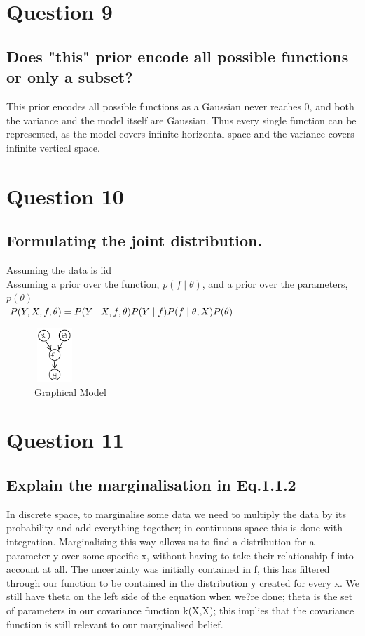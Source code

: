 \documentclass[a4paper, 9pt]{article}
\begin{document}
\section*{Question 9}
\subsection*{Does "this" prior encode all possible functions or only a subset?}
This prior encodes all possible functions as a Gaussian never reaches 0, and both the variance and the model itself are Gaussian. Thus every single function can be represented, as the model covers infinite horizontal space and the variance covers infinite vertical space.

\section*{Question 10}
\subsection*{Formulating the joint distribution.}
Assuming the data is iid \\
\newline
Assuming a prior over the function, \( p (f \mid \theta) \), and a prior over the parameters, \(p(\theta ) \) \\
\newline
\( P(Y, X, f, \theta) = P(Y \mid X, f, \theta) \\
\newline
P(Y \mid f)P(f \mid \theta, X)P( \theta) \)\\
\begin{figure}[h]
\begin{center}
\includegraphics[width=0.6in,height=0.8in]{path}
\end{center}
\caption{Graphical Model}
\end{figure}

\section*{Question 11}
\subsection*{Explain the marginalisation in Eq.1.1.2}
In discrete space, to marginalise some data we need to multiply the data by its probability and add everything together; in continuous space this is done with integration. Marginalising this way allows us to find a distribution for a parameter y over some specific x, without having to take their relationship f into account at all. The uncertainty was initially contained in f, this has filtered through our function to be contained in the distribution y created for every x. We still have theta on the left side of the equation when we?re done; theta is the set of parameters in our covariance function k(X,X); this implies that the covariance function is still relevant to our marginalised belief.
\end{document}
